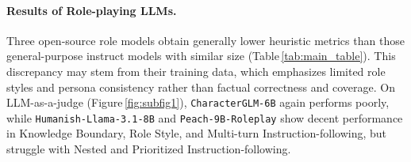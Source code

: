 \paragraph{Results of Role-playing LLMs.} Three open-source role models obtain generally lower heuristic metrics than those general-purpose instruct models with similar size (Table\,\ref{tab:main_table}). This discrepancy may stem from their training data, which emphasizes limited role styles and persona consistency rather than factual correctness and coverage. On LLM-as-a-judge (Figure\,\ref{fig:subfig1}), \texttt{CharacterGLM-6B} again performs poorly, while \texttt{Humanish-Llama-3.1-8B} and \texttt{Peach-9B-Roleplay} show decent performance in Knowledge Boundary, Role Style, and Multi-turn Instruction-following, but struggle with Nested and Prioritized Instruction-following.

